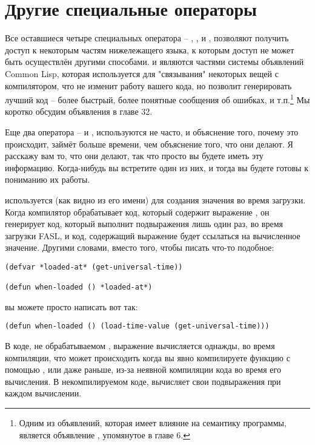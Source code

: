 \section{Другие специальные операторы}

Все оставшиеся четыре специальных оператора -- , ,
 и , позволяют получить доступ к некоторым частям
нижележащего языка, к которым доступ не может быть осуществлён другими способами.
 и  являются частями системы объявлений Common Lisp, которая
используется для "связывания" некоторых вещей с компилятором, что не изменит работу вашего
кода, но позволит генерировать лучший код -- более быстрый, более понятные сообщения об
ошибках, и т.п.\footnote{Одним из объявлений, которая имеет влияние на семантику
  программы, является объявление , упомянутое в главе 6.}  Мы коротко
обсудим объявления в главе 32.

Еще два оператора --  и , используются не часто, и
объяснение того, почему это происходит, займёт больше времени, чем объяснение того, что
они делают. Я расскажу вам то, что они делают, так что просто вы будете иметь эту
информацию. Когда-нибудь вы встретите один из них, и тогда вы будете готовы к пониманию их
работы.

 используется (как видно из его имени) для создания значения во
время загрузки.  Когда компилятор обрабатывает код, который содержит выражение
, он генерирует код, который выполнит подвыражения лишь один раз, во
время загрузки FASL, и код, содержащий выражение  будет ссылаться на
вычисленное значение.  Другими словами, вместо того, чтобы писать что-то подобное:

\begin{lstlisting}
(defvar *loaded-at* (get-universal-time))

(defun when-loaded () *loaded-at*)
\end{lstlisting}

вы можете просто написать вот так:

\begin{lstlisting}
(defun when-loaded () (load-time-value (get-universal-time)))
\end{lstlisting}

В коде, не обрабатываемом , выражение 
вычисляется однажды, во время компиляции, что может происходить когда вы явно компилируете
функцию с помощью , или даже раньше, из-за неявной компиляции кода во время
его вычисления.  В некомпилируемом коде,  вычисляет свои
подвыражения при каждом вычислении.

